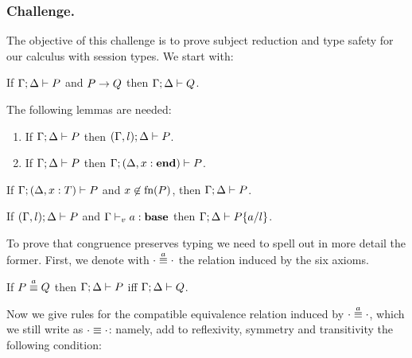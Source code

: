 \documentclass[runningheads]{llncs}
\begin{document}
\subsubsection{Challenge.}
The objective of this challenge is to prove subject reduction and type safety for our calculus with session types. We start with:
\begin{theorem}
  \label{thm:subject-reduction}
  If \( \types{\Gamma;\Delta}{P} \) and \( \reduces{P}{Q} \) then \( \types{\Gamma;\Delta}{Q} \).
\end{theorem}

The following lemmas are needed:
\begin{lemma}[Weakening]\mbox{}
  \label{lemma:weak}
  \begin{enumerate}
  \item If \( \types{\Gamma; \Delta}{P} \) then
    \( \types{(\Cadd{\Gamma}{l});\Delta}{P} \).
  \item If \( \types{\Gamma; \Delta}{P} \) %
    then \( \types{\Gamma;(\Cadd{\Delta}{\hastype{x}{\Tend}})}{P} \).
  \end{enumerate}
\end{lemma}

\begin{lemma}[Strengthening]\mbox{}
  \label{lemma:strenD}
  If \( \types{\Gamma; (\Cadd{\Delta}{\hastype{x}{T}})}{P} \) and
  $x\not\in \freenames{P}$, then \( \types{\Gamma; \Delta}{P} \).
\end{lemma}

\begin{lemma}[Substitution]\mbox{}
  \label{le:subst}
  If $\types{(\Cadd{\Gamma}{l});\Delta}{P}$ and
  ${\typev{\Gamma}{\hastype{a}{\Tbase}}}$ then
  \( \types{\Gamma;\Delta}{\subst{P}{a}{l}} \).
\end{lemma}

To prove that congruence preserves typing we need to spell out in more detail the former. First, we denote with $\sconga\cdot\cdot$ the relation induced by the six axioms.

\begin{lemma}
  \label{le:presequiva}
  If \( \sconga{P}{Q} \) then \( \types{\Gamma;\Delta}{P} \)  iff \( \types{\Gamma;\Delta}{Q} \).
\end{lemma}

Now we give rules for the compatible
equivalence relation induced by $\sconga\cdot\cdot$, which we still
write as $\scong\cdot\cdot$: namely, add to reflexivity, symmetry and
transitivity the following condition:
 \begin{mathpar}
 \end{mathpar}
\end{document}
